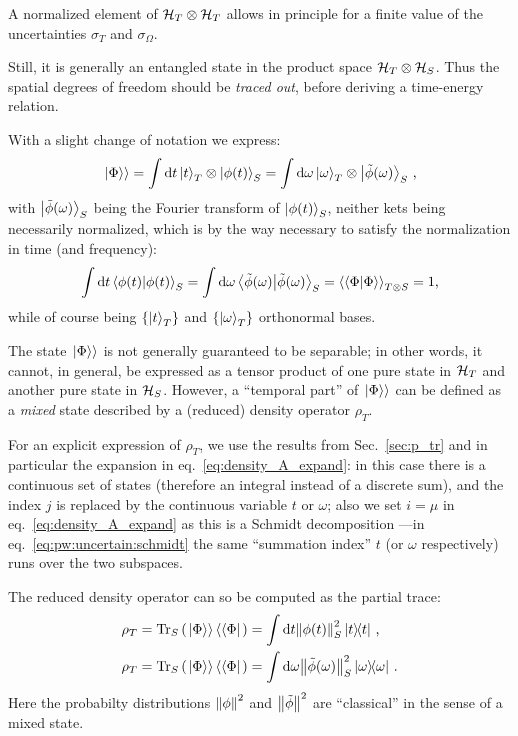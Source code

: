 A normalized element of $\mathcal{H}_T \otimes \mathcal{H}_T$ allows in principle for a finite value
of the uncertainties $\sigma_{T}$ and $\sigma_{\Omega}$.

Still, it is generally an entangled state in the product space $\mathcal{H}_T \otimes \mathcal{H}_S$.
Thus the spatial degrees of freedom should be \emph{traced out},
before deriving a time-energy relation.

With a slight change of notation we express:
\begin{equation}\label{eq:pw:uncertain:schmidt}
  \left.\left| \Phi \right\rangle\right\rangle =
    \int \dd{t} \ket{t}_T \otimes \ket{\phi(t)}_S =
    \int \dd\omega \ket{\omega}_T \otimes \ket{\tilde{\phi}(\omega)}_S \, \text{,}
\end{equation}
with $\ket{\tilde{\phi}(\omega)}_S$ being the Fourier transform
of $\ket{\phi(t)}_S$,
neither kets being necessarily normalized, which is by the way necessary
to satisfy the normalization in time (and frequency):
\[
  \int \dd{t} \braket{\phi(t)}_S =
    \int \dd{\omega} \braket{\tilde{\phi}(\omega)}_S =
    \left\langle\left\langle \Phi \middle| \Phi \right\rangle\right\rangle_{T \otimes S} =
    1
    \text{,}
\]
while of course being $\left\{\ket{t}_T\right\}$ and $\left\{\ket{\omega}_T\right\}$
orthonormal bases.

The state $\left.\left| \Phi \right\rangle\right\rangle$ is not generally guaranteed to be separable;
in other words, it cannot,
in general, be expressed as a tensor product of one pure state in $\mathcal{H}_T$
and another pure state in $\mathcal{H}_S$. However,
a ``temporal part'' of $\left.\left| \Phi \right\rangle\right\rangle$
can be defined as a \emph{mixed} state described
by a (reduced) density operator $\rho_T$.

For an explicit expression of $\rho_T$,
we use the results from Sec.~\ref{sec:p_tr}
and in particular the expansion in eq.~\eqref{eq:density_A_expand}:
in this case there is a continuous set of states (therefore an integral instead of a discrete sum),
and the index $j$ is replaced by the continuous variable $t$ or $\omega$;
also we set $i = \mu$ in eq.~\eqref{eq:density_A_expand}
as this is a Schmidt decomposition ---in
eq.~\eqref{eq:pw:uncertain:schmidt} the same ``summation index'' $t$ (or $\omega$ respectively)
runs over the two subspaces.

The reduced density operator can so be computed
as the partial trace:
\begin{align}
  \label{eq:ptrace_density_matrix_t}
  {\rho}_T = \Tr_S\qty(\left.\left| \Phi \right\rangle\right\rangle\left\langle\left\langle \Phi \right|\right.) &= \int \dd t \norm{\phi(t)}^2_S \ketbra{t}{t}
    \, \text{,}
  \\
  \label{eq:ptrace_density_matrix_omega}
  {\rho}_T = \Tr_S\qty(\left.\left| \Phi \right\rangle\right\rangle\left\langle\left\langle \Phi \right|\right.) &= \int \dd \omega \norm{\tilde{\phi}(\omega)}^2_S \ketbra{\omega}{\omega}
    \,\text{.} 
\end{align}
Here the probabilty distributions $\norm{\phi}^2$ and $\norm{\tilde{\phi}}^2$
are ``classical'' in the sense of a mixed state.

